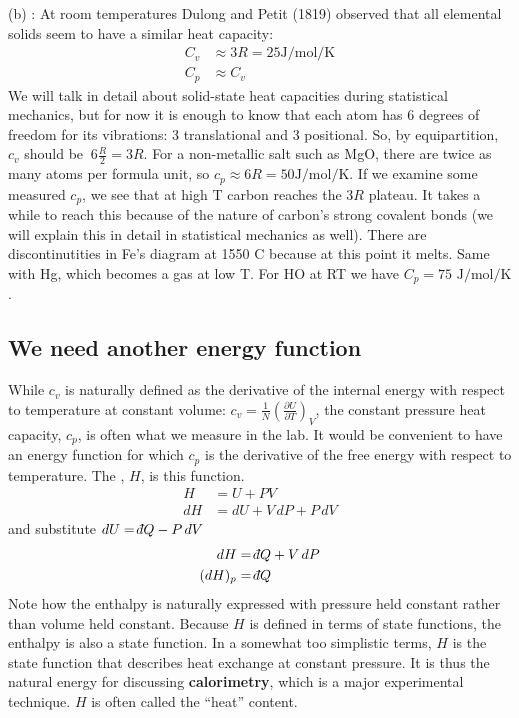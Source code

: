 \documentclass[12pt]{article}
\def\dbar{{\mathchar'26\mkern-12mu d}}
\begin{document}
(b) : At room temperatures Dulong and Petit (1819) observed that all elemental solids seem to have a similar heat capacity:
\begin{align*}
C_v &\approx 3 R = 25 \text{J}/\text{mol}/\text{K}\\
C_p & \approx C_v
\end{align*}
We will talk in detail about solid-state heat capacities during statistical mechanics, but for now it is enough to know that each atom has 6 degrees of freedom for its vibrations: 3 translational and 3 positional. So, by equipartition, $c_v$ should be $~6 \frac{R}{2}=3R$. For a non-metallic salt such as MgO, there are twice as many atoms per formula unit, so $c_p \approx 6 R = 50\text{J}/\text{mol}/\text{K}$.   If we examine some measured  $c_p$, we see that at high T carbon reaches the $3R$ plateau.  It takes a while to reach this because of the nature of carbon's strong covalent bonds (we will explain this in detail in statistical mechanics as well).  There are discontinutities in Fe's diagram at 1550 \degree C because at this point it melts.  Same with Hg, which becomes a gas at low T.  For H\2O at RT we have $C_p = 75 \text{ J}/\text{mol}/\text{K}$.

\subsection{We need another energy function}
While $c_v$ is naturally defined as the derivative of the internal energy with respect to temperature at constant volume: $c_v = \frac{1}{N} \left(\frac{\partial U}{\partial T}\right)_V$, the constant pressure heat capacity, $c_p$, is often what we measure in the lab. It would be convenient to have an energy function for which $c_p$ is the derivative of the free energy with respect to temperature. The , $H$, is this function.
\begin{align*}
H &= U + PV\\
dH &= dU + V \, dP + P \, dV
\end{align*}
and substitute $dU = \dbar Q - P \, dV$
\begin{align*}
dH &= \dbar Q + V \, dP\\
(dH)_p &= \dbar Q
\end{align*}
Note how the enthalpy is naturally expressed with pressure held constant rather than volume held constant. Because $H$ is defined in terms of state functions, the enthalpy is also a state function. In a somewhat too simplistic terms, $H$ is the state function that describes heat exchange at constant pressure.  It is thus the natural energy for discussing \textbf{calorimetry}, which is a major experimental technique.  $H$ is often called the ``heat'' content.\\
\end{document}
